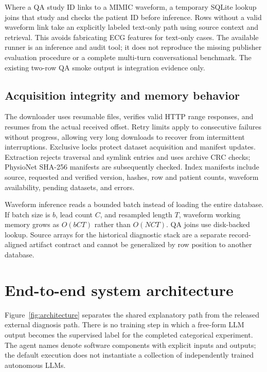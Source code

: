 \documentclass[11pt,a4paper]{article}
\newcommand{\code}[1]{\texttt{\detokenize{#1}}}
\begin{document}
Where a QA study ID links to a MIMIC waveform, a temporary SQLite lookup joins that study and checks the patient ID before inference. Rows without a valid waveform link take an explicitly labeled text-only path using source context and retrieval. This avoids fabricating ECG features for text-only cases. The available runner is an inference and audit tool; it does not reproduce the missing publisher evaluation procedure or a complete multi-turn conversational benchmark. The existing two-row QA smoke output is integration evidence only.

\subsection{Acquisition integrity and memory behavior}
The downloader uses resumable \code{.zip.part} files, verifies valid HTTP range responses, and resumes from the actual received offset. Retry limits apply to consecutive failures without progress, allowing very long downloads to recover from intermittent interruptions. Exclusive locks protect dataset acquisition and manifest updates. Extraction rejects traversal and symlink entries and uses archive CRC checks; PhysioNet SHA-256 manifests are subsequently checked. Index manifests include source, requested and verified version, hashes, row and patient counts, waveform availability, pending datasets, and errors.

Waveform inference reads a bounded batch instead of loading the entire database. If batch size is $b$, lead count $C$, and resampled length $T$, waveform working memory grows as $O(bCT)$ rather than $O(NCT)$. QA joins use disk-backed lookup. Source arrays for the historical diagnostic stack are a separate record-aligned artifact contract and cannot be generalized by row position to another database.

\section{End-to-end system architecture}
\label{sec:architecture}
Figure~\ref{fig:architecture} separates the shared explanatory path from the released external diagnosis path. There is no training step in which a free-form LLM output becomes the supervised label for the completed categorical experiment. The agent names denote software components with explicit inputs and outputs; the default execution does not instantiate a collection of independently trained autonomous LLMs.
\end{document}
